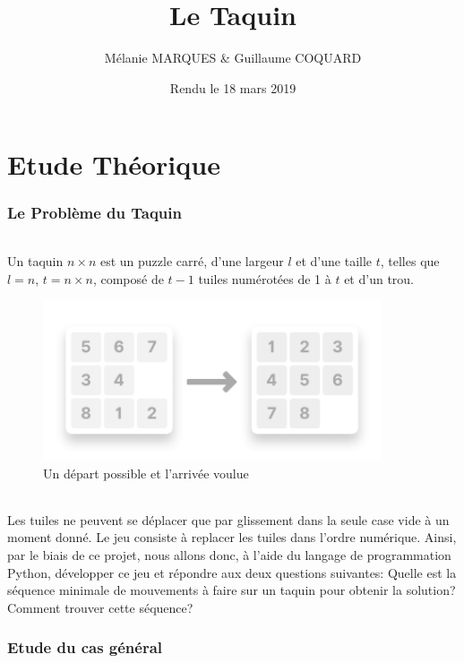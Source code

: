 \documentclass[10pt,a4paper]{report}
\title{\Huge{\textbf{Le Taquin}}}
\author{Mélanie MARQUES \& Guillaume COQUARD}
\date{Rendu le 18 mars 2019}
\begin{document}
\begin{titlepage}
\maketitle
\end{titlepage}
\part{Etude Théorique}
\section{Le Problème du Taquin}
\paragraph{} {Un taquin ${n \times n}$ est un puzzle carré, d'une largeur ${l}$ et d'une taille ${t}$, telles que ${l = n}$, ${t = n \times n}$, composé de ${t - 1}$ tuiles numérotées de 1 à ${t}$ et d’un trou.}
\begin{figure}[!h]
\centering
\includegraphics[keepaspectratio=true,width=10cm]{./inc/media/presentation_twoTaquins.pdf}
\caption{Un départ possible et l'arrivée voulue}
\label{presentationTwoTaquins}
\end{figure}
\paragraph{} {Les tuiles ne peuvent se déplacer que par glissement dans la seule case vide à un moment donné. Le jeu consiste à replacer les tuiles dans l’ordre numérique. Ainsi, par le biais de ce projet, nous allons donc, à l'aide du langage de programmation {\ttfamily Python}, développer ce jeu et répondre aux deux questions suivantes: Quelle est la séquence minimale de mouvements à faire sur un taquin pour obtenir la solution? Comment trouver cette séquence?}
\section{Etude du cas général}
\end{document}
